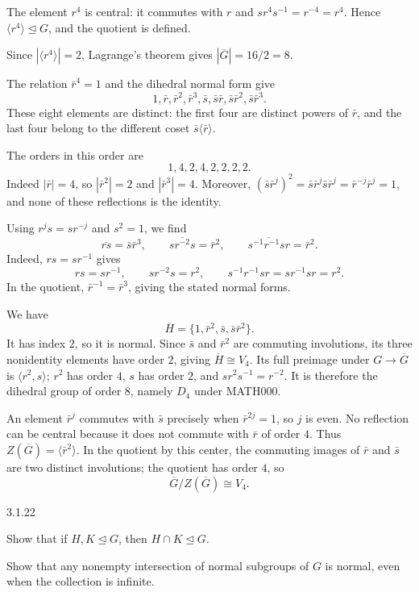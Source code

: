 \documentclass[11pt,oneside]{article}
\begin{document}
\begin{solution}
The element $r^4$ is central: it commutes with $r$ and $sr^4s^{-1}=r^{-4}=r^4$. Hence $\langle r^4\rangle\trianglelefteq G$, and the quotient is defined.
\begin{exercisesubparts}
\item Since $|\langle r^4\rangle|=2$, Lagrange's theorem gives $|\overline G|=16/2=8$.
\item The relation $\bar r^4=1$ and the dihedral normal form give
\[
1,\bar r,\bar r^2,\bar r^3,\bar s,\bar s\bar r,\bar s\bar r^2,\bar s\bar r^3.
\]
These eight elements are distinct: the first four are distinct powers of $\bar r$, and the last four belong to the different coset $\bar s\langle\bar r\rangle$.
\item The orders in this order are
\[
 \boxed{1,4,2,4,2,2,2,2}.
\]
Indeed $|\bar r|=4$, so $|\bar r^2|=2$ and $|\bar r^3|=4$. Moreover, $(\bar s\bar r^j)^2=\bar s\bar r^j\bar s\bar r^j=\bar r^{-j}\bar r^j=1$, and none of these reflections is the identity.
\item Using $r^js=sr^{-j}$ and $s^2=1$, we find
\[
\overline{rs}=\bar s\bar r^3,\qquad
\overline{sr^{-2}s}=\bar r^2,\qquad
\overline{s^{-1}r^{-1}sr}=\bar r^2.
\]
Indeed, $rs=sr^{-1}$ gives
\[
rs=sr^{-1},\qquad
sr^{-2}s=r^2,\qquad
s^{-1}r^{-1}sr=sr^{-1}sr=r^2.
\]
In the quotient, $\bar r^{-1}=\bar r^3$, giving the stated normal forms.
\item We have
\[
\overline H=\{1,\bar r^2,\bar s,\bar s\bar r^2\}.
\]
It has index $2$, so it is normal. Since $\bar s$ and $\bar r^2$ are commuting involutions, its three nonidentity elements have order $2$, giving $\overline H\cong V_4$. Its full preimage under $G\to\overline G$ is $\langle r^2,s\rangle$; $r^2$ has order $4$, $s$ has order $2$, and $s r^2s^{-1}=r^{-2}$. It is therefore the dihedral group of order $8$, namely $D_4$ under MATH000.
\item An element $\bar r^j$ commutes with $\bar s$ precisely when $\bar r^{2j}=1$, so $j$ is even. No reflection can be central because it does not commute with $\bar r$ of order $4$. Thus $Z(\overline G)=\langle\bar r^2\rangle$. In the quotient by this center, the commuting images of $\bar r$ and $\bar s$ are two distinct involutions; the quotient has order $4$, so
\[
\overline G/Z(\overline G)\cong V_4.
\]
\end{exercisesubparts}
\end{solution}

\begin{exercise}{3.1.22}
\begin{exercisesubparts}
\item Show that if $H,K\trianglelefteq G$, then $H\cap K\trianglelefteq G$.
\item Show that any nonempty intersection of normal subgroups of $G$ is normal, even when the collection is infinite.
\end{exercisesubparts}
\end{exercise}
\end{document}

